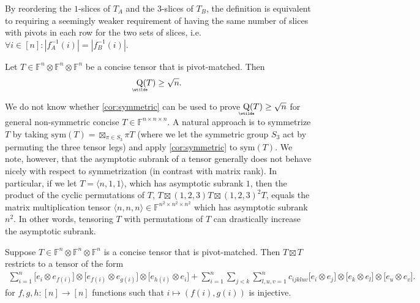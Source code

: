 \documentclass{daj}
\DeclareMathOperator{\asympsubrank}{\underaccent{\wtilde}{Q}}
\newcommand{\FF}{\mathbb{F}}
\begin{document}
    
%

\begin{remark}
    By reordering the $1$-slices of $T_A$ and the $3$-slices of $T_B$, the definition is equivalent to requiring a seemingly weaker requirement of having the same number of slices with pivots in each row for the two sets of slices, i.e.~$\forall i\in[n]:|f_A^{-1}(i)|=|f_B^{-1}(i)|$.
\end{remark}

%
%
%
%
%
%
%
%
%
%
%
%
%
%
%

\begin{theorem} \label{thm:samePivotsInRow_sqrtLowerBound_asymsub}
    Let $T\in\FF^{n}\otimes\FF^{n}\otimes\FF^{n}$ be a concise tensor that is pivot-matched. Then 
    \[\asympsubrank(T)\geq\sqrt{n}.\]
\end{theorem}

%
%
%
%

\begin{remark}
    We do not know whether \autoref{cor:symmetric} can be used to prove $\asympsubrank(T) \geq \sqrt{n}$ for general non-symmetric concise $T \in \FF^{n \times n \times n}$. 
    A natural approach is to symmetrize $T$ by taking $\mathrm{sym}(T) = \boxtimes_{\pi \in S_3} \pi T$ (where we let the symmetric group $S_3$ act by permuting the three tensor legs) and apply \autoref{cor:symmetric} to $\mathrm{sym}(T)$.
    We note, however, that the asymptotic subrank of a tensor generally does not behave nicely with respect to symmetrization (in contrast with matrix rank). 
    In particular, if we let $T = \langle n,1,1\rangle$, which has asymptotic subrank $1$, then the product of the cyclic permutations of $T$, $T \boxtimes (1,2,3) T \boxtimes (1,2,3)^2 T$, equals the matrix multiplication tensor $\langle n,n,n\rangle \in \FF^{n^2 \times n^2 \times n^2}$ which has asymptotic subrank~$n^2$. In other words, tensoring $T$ with permutations of $T$ can drastically increase the asymptotic subrank.
\end{remark}

%
\begin{lemma}\label{lem:upper-triangular}
    Suppose $T\in\FF^n\otimes\FF^n\otimes\FF^n$ is a concise tensor that is %
    pivot-matched. 
    Then
    $T\boxtimes T$ restricts to a tensor of the form
\begin{multline}\label{eq:req-form}
\sum_{i=1}^n \big[e_i\otimes e_{f(i)}\big]\otimes\big[e_{f(i)}\otimes e_{g(i)}\big] \otimes \big[e_{h(i)}\otimes e_i\big]
+ \sum_{i=1}^n\sum_{j<k}\sum_{l,u,v=1}^n c_{ijkluv}\big[e_i\otimes e_j\big]\otimes \big[e_k\otimes e_l\big]\otimes \big[e_u\otimes e_v].
\end{multline}
for $f,g,h:[n]\to[n]$ functions such that $i\mapsto(f(i),g(i))$ is injective.
\end{lemma}
\end{document}
